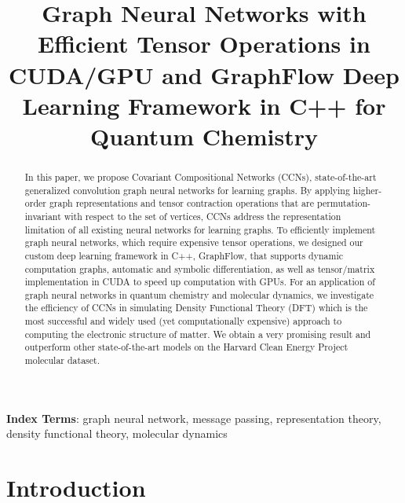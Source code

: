 \documentclass[a4paper]{article}
\title{Graph Neural Networks with Efficient Tensor Operations in CUDA/GPU and GraphFlow Deep Learning Framework in C++ for Quantum Chemistry}
\begin{document}
\pagestyle{headings}

\maketitle
% 
\begin{abstract}
In this paper, we propose Covariant Compositional Networks (CCNs), state-of-the-art generalized convolution graph neural networks for learning graphs. By applying higher-order graph representations and tensor contraction operations that are permutation-invariant with respect to the set of vertices, CCNs address the representation limitation of all existing neural networks for learning graphs. To efficiently implement graph neural networks, which require expensive tensor operations, we designed our custom deep learning framework in C++, GraphFlow, that supports dynamic computation graphs, automatic and symbolic differentiation, as well as tensor/matrix implementation in CUDA to speed up computation with GPUs. For an application of graph neural networks in quantum chemistry and molecular dynamics, we investigate the efficiency of CCNs in simulating Density Functional Theory (DFT) which is the most successful and widely used (yet computationally expensive) approach to computing the electronic structure of matter. We obtain a very promising result and outperform other state-of-the-art models on the Harvard Clean Energy Project molecular dataset. \\
\end{abstract}
\noindent\textbf{Index Terms}: graph neural network, message passing, representation theory, density functional theory, molecular dynamics

\section{Introduction}
\end{document}
